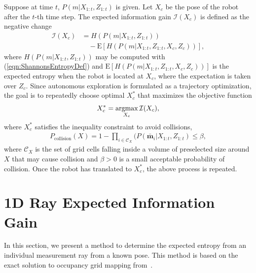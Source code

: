 \documentclass[letterpaper, 10pt]{ieeeconf}
\newcommand{\refeqn}[1]{(\ref{eqn:#1})}
\newcommand{\argmax}{\operatornamewithlimits{argmax}}
\begin{document}
Suppose at time $t$, $P(m|X_{1:t},Z_{1:t})$ is given. Let $X_c$ be the pose of the robot after the $t$-th time step.
The expected information gain $\mathcal I(X_c)$ is defined as the negative change
\begin{align}
\label{eqn:ObjFun}
\mathcal I(X_c)&=H(P(m|X_{1:t},Z_{1:t}))\nonumber\\&\quad-\text{E}\left[H(P(m|X_{1:t},Z_{1:t},X_c,Z_c))\right],
\end{align}
where $H(P(m|X_{1:t},Z_{1:t}))$ may be computed with \refeqn{ShannonsEntropyDef} and $\text{E}\left[H(P(m|X_{1:t},Z_{1:t},X_c,Z_c))\right]$ is the expected entropy when the robot is located at $X_c$, where the expectation is taken over $Z_c$.
Since autonomous exploration is formulated as a trajectory optimization, the goal is to repeatedly choose optimal $X_c^*$ that maximizes the objective function
\begin{align}
\label{eqn:Objective}
X_c^*=\argmax_{X_c}{\mathcal I(X_c)},
\end{align}
where $X_c^*$ satisfies the inequality constraint to avoid collisions,
\begin{align}
\label{eqn:CollisionInequalityConstraint}
P_\text{collision}(X)=1-\prod_{i\in\mathcal C_X}(P(\bar{\mathbf{m}}_i|X_{1:t},Z_{1:t})\leq\beta,
\end{align}
where $\mathcal C_X$ is the set of grid cells falling inside a volume of preselected size around $X$ that may cause collision and $\beta>0$ is a small acceptable probability of collision.
Once the robot has translated to $X_c^*$, the above process is repeated.


\section{1D Ray Expected Information Gain}

In this section, we present a method to determine the expected entropy from an individual measurement ray from a known pose. This method is based on the exact solution to occupancy grid mapping from~\cite{KauLeeAiMos16}.
\end{document}
